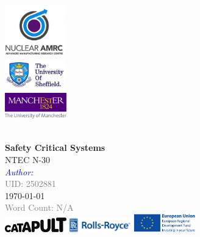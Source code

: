 \documentclass[12pt,a4paper]{article}
\begin{document}
\begin{titlepage}
\begin{minipage}{0.95\textwidth}
\begin{flushright} \large
\includegraphics[width=0.2\textwidth]{Imgs/namrclogo}\\
\includegraphics[width=0.2\textwidth]{Imgs/sheffunilogo}\\
\includegraphics[width=0.2\textwidth]{Imgs/manunilogo}
\end{flushright}
\end{minipage}\\[5cm]
\newcommand{\HRule}{\rule{\linewidth}{0.5mm}}
\centering
{\color{Blue} \Huge \bfseries Safety Critical Systems} %
\\{\color{Grey}  \large NTEC N-30}
\\[0.4cm]%
\textcolor{Blue}{\emph{Author:}} \\
\textcolor{Grey}{UID: \textsc{2502881}}\\\bigskip
{\color{Blue} \large \today}\\ %
\textcolor{Grey}{Word Count: N/A}\\[7.5cm]
\includegraphics[width=0.2\textwidth]{Imgs/Catlogo}\hspace{3cm}
\includegraphics[width=0.2\textwidth]{Imgs/RRlogo}\hspace{3cm}
\includegraphics[width=0.2\textwidth]{Imgs/EU7thlogo} 
\vfill %
\end{titlepage}
\newpage
\end{document}
